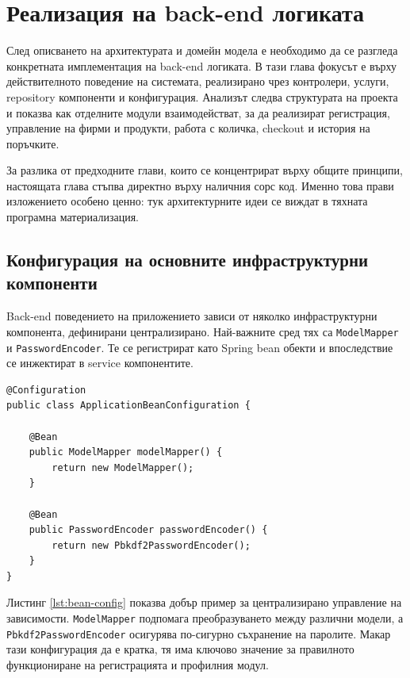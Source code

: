 \section{Реализация на back-end логиката}

След описването на архитектурата и домейн модела е необходимо да се разгледа конкретната имплементация на back-end логиката. В тази глава фокусът е върху действителното поведение на системата, реализирано чрез контролери, услуги, repository компоненти и конфигурация. Анализът следва структурата на проекта и показва как отделните модули взаимодействат, за да реализират регистрация, управление на фирми и продукти, работа с количка, checkout и история на поръчките.

За разлика от предходните глави, които се концентрират върху общите принципи, настоящата глава стъпва директно върху наличния сорс код. Именно това прави изложението особено ценно: тук архитектурните идеи се виждат в тяхната програмна материализация.

\subsection{Конфигурация на основните инфраструктурни компоненти}

Back-end поведението на приложението зависи от няколко инфраструктурни компонента, дефинирани централизирано. Най-важните сред тях са \texttt{ModelMapper} и \texttt{PasswordEncoder}. Те се регистрират като Spring bean обекти и впоследствие се инжектират в service компонентите.

\begin{lstlisting}[caption={Конфигурация на mapper и password encoder},label={lst:bean-config}]
@Configuration
public class ApplicationBeanConfiguration {

    @Bean
    public ModelMapper modelMapper() {
        return new ModelMapper();
    }

    @Bean
    public PasswordEncoder passwordEncoder() {
        return new Pbkdf2PasswordEncoder();
    }
}
\end{lstlisting}

Листинг \ref{lst:bean-config} показва добър пример за централизирано управление на зависимости. \texttt{ModelMapper} подпомага преобразуването между различни модели, а \texttt{Pbkdf2PasswordEncoder} осигурява по-сигурно съхранение на паролите. Макар тази конфигурация да е кратка, тя има ключово значение за правилното функциониране на регистрацията и профилния модул.

